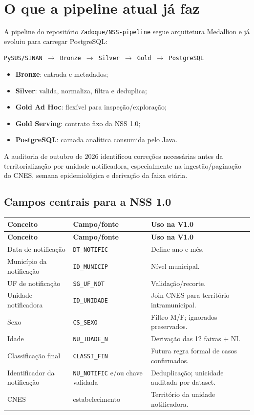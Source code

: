 \documentclass[12pt,a4paper]{article}
\begin{document}
\section{O que a pipeline atual já faz}
A pipeline do repositório \texttt{Zadoque/NSS-pipeline} segue arquitetura Medallion e já evoluiu para carregar PostgreSQL:
\begin{center}\texttt{PySUS/SINAN $\rightarrow$ Bronze $\rightarrow$ Silver $\rightarrow$ Gold $\rightarrow$ PostgreSQL}\end{center}
\begin{itemize}[leftmargin=*]\item \textbf{Bronze}: entrada e metadados;\item \textbf{Silver}: valida, normaliza, filtra e deduplica;\item \textbf{Gold Ad Hoc}: flexível para inspeção/exploração;\item \textbf{Gold Serving}: contrato fixo da NSS 1.0;\item \textbf{PostgreSQL}: camada analítica consumida pelo Java.\end{itemize}
A auditoria de outubro de 2026 identificou correções necessárias antes da territorialização por unidade notificadora, especialmente na ingestão/paginação do CNES, semana epidemiológica e derivação da faixa etária.
\subsection{Campos centrais para a NSS 1.0}
\begin{longtable}{p{4.2cm}p{3.3cm}p{7.1cm}}\toprule\textbf{Conceito} & \textbf{Campo/fonte} & \textbf{Uso na V1.0} \\\midrule\endfirsthead\toprule\textbf{Conceito} & \textbf{Campo/fonte} & \textbf{Uso na V1.0} \\\midrule\endhead
Data de notificação & \texttt{DT\_NOTIFIC} & Define ano e mês. \\
Município da notificação & \texttt{ID\_MUNICIP} & Nível municipal. \\
UF de notificação & \texttt{SG\_UF\_NOT} & Validação/recorte. \\
Unidade notificadora & \texttt{ID\_UNIDADE} & Join CNES para território intramunicipal. \\
Sexo & \texttt{CS\_SEXO} & Filtro M/F; ignorados preservados. \\
Idade & \texttt{NU\_IDADE\_N} & Derivação das 12 faixas + NI. \\
Classificação final & \texttt{CLASSI\_FIN} & Futura regra formal de casos confirmados. \\
Identificador da notificação & \texttt{NU\_NOTIFIC} e/ou chave validada & Deduplicação; unicidade auditada por dataset. \\
CNES & estabelecimento & Território da unidade notificadora. \\
\bottomrule\end{longtable}
\end{document}
